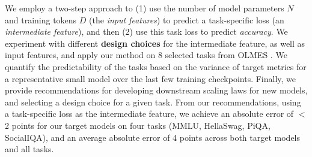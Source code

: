 We employ a two-step approach to (1) use the number of model parameters $N$ and training tokens $D$ (the \textit{input features}) to predict a task-specific loss (an \textit{intermediate feature}), and then (2) use this task loss to predict \textit{accuracy}. We experiment with different \textbf{design choices} for the intermediate feature, as well as input features, and apply our method on 8 selected tasks from OLMES \citep{gu2024olmes}. We quantify the predictability of the tasks based on the variance of target metrics for a representative small model over the last few training checkpoints. Finally, we provide recommendations for developing downstream scaling laws for new models, and selecting a design choice for a given task. From our recommendations, using a task-specific loss as the intermediate feature, we achieve an absolute error of $<$ 2 points for our target models on four tasks (MMLU, HellaSwag, PiQA, SocialIQA), and an average absolute error of 4 points across both target models and all tasks.




